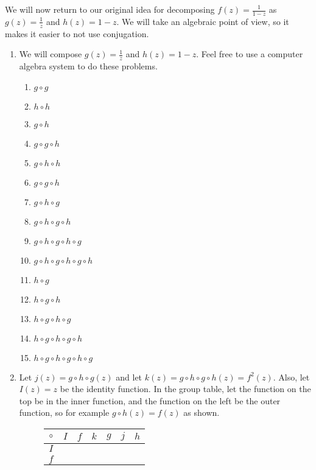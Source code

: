 \documentclass[../gatm.tex]{subfiles}
\begin{document}
\noindent We will now return to our original idea for decomposing $f(z)=\frac{1}{1-z}$ as $g(z)=\frac{1}{z}$ and $h(z)=1-z$. We will take an algebraic point of view, so it makes it easier to not use conjugation.

\begin{enumerate}
\setcounter{enumi}{\value{problem_i}}
\item We will compose $g(z)=\frac{1}{z}$ and $h(z)=1-z$. Feel free to use a computer algebra system to do these problems.
\begin{multicols}{3}
\begin{enumerate}
\item $g\circ g$
\item $h\circ h$
\item $g\circ h$
\item $g\circ g\circ h$
\item $g\circ h\circ h$
\item $g\circ g\circ h$
\item $g\circ h\circ g$
\item $g\circ h\circ g\circ h$
\item $g\circ h\circ g\circ h\circ g$
\item $g\circ h\circ g\circ h\circ g\circ h$
\item $h\circ g$
\item $h\circ g\circ h$
\item $h\circ g\circ h\circ g$
\item $h\circ g\circ h\circ g\circ h$
\item $h\circ g\circ h\circ g\circ h\circ g$
\end{enumerate}
\end{multicols}
\item Let $j(z)=g\circ h\circ g(z)$ and let $k(z)=g\circ h\circ g\circ h(z)=f^2(z)$. Also, let $I(z)=z$ be the identity function. In the group table, let the function on the top be in the inner function, and the function on the left be the outer function, so for example $g\circ h(z)=f(z)$ as shown.
\begin{figure}[h]
	\begin{center}
		\begin{minipage}[b]{\textwidth}
			\centering
			\begin{tabular}{c|cccccc}
				\hline
				$\circ$ & $I$ & $f$ & $k$ & $g$ & $j$ & $h$ \\ \hline
				\rowcolor{light-gray}
				$I$ & & & & & & \\
				$f$ & & & & & & \\

\end{tabular}
\end{minipage}
\end{center}
\end{figure}
\end{enumerate}
\end{document}
